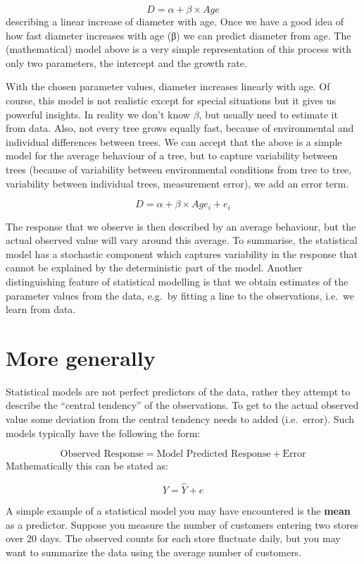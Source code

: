 \documentclass[
  letterpaper,
  DIV=11,
  numbers=noendperiod,
  oneside]{scrreprt}
\begin{document}
\[D = \alpha + \beta \times Age\] describing a linear increase of
diameter with age. Once we have a good idea of how fast diameter
increases with age (β) we can predict diameter from age. The
(mathematical) model above is a very simple representation of this
process with only two parameters, the intercept and the growth rate.

With the chosen parameter values, diameter increases linearly with age.
Of course, this model is not realistic except for special situations but
it gives us powerful insights. In reality we don't know \(\beta\), but
usually need to estimate it from data. Also, not every tree grows
equally fast, because of environmental and individual differences
between trees. We can accept that the above is a simple model for the
average behaviour of a tree, but to capture variability between trees
(because of variability between environmental conditions from tree to
tree, variability between individual trees, measurement error), we add
an error term.

\[D = \alpha + \beta \times Age_i + e_i\]

The response that we observe is then described by an average behaviour,
but the actual observed value will vary around this average. To
summarise, the statistical model has a stochastic component which
captures variability in the response that cannot be explained by the
deterministic part of the model. Another distinguishing feature of
statistical modelling is that we obtain estimates of the parameter
values from the data, e.g.~by fitting a line to the observations,
i.e.~we learn from data.

\section*{More generally}\label{more-generally}


Statistical models are not perfect predictors of the data, rather they
attempt to describe the ``central tendency'' of the observations. To get
to the actual observed value some deviation from the central tendency
needs to added (i.e.~error). Such models typically have the following
the form:

\[
\text{Observed Response} = \text{Model Predicted Response} + \text{Error}
\] Mathematically this can be stated as:

\[ Y = \hat{Y} + e\]

A simple example of a statistical model you may have encountered is the
\textbf{mean} as a predictor. Suppose you measure the number of
customers entering two stores over 20 days. The observed counts for each
store fluctuate daily, but you may want to summarize the data using the
average number of customers.
\end{document}

